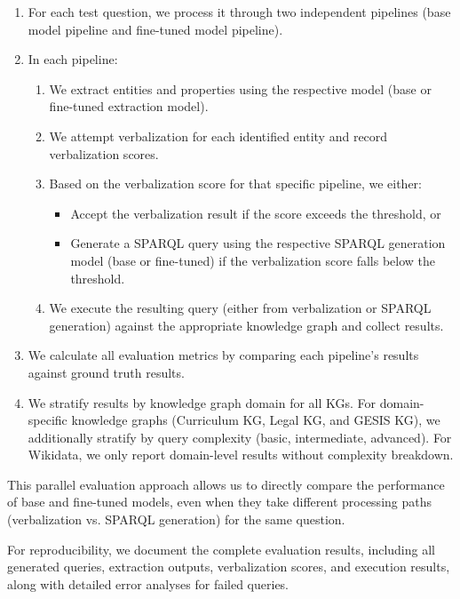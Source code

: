 \begin{enumerate}
    \item For each test question, we process it through two independent pipelines (base model pipeline and fine-tuned model pipeline).
    
    \item In each pipeline:
    \begin{enumerate}
        \item We extract entities and properties using the respective model (base or fine-tuned extraction model).
        \item We attempt verbalization for each identified entity and record verbalization scores.
        \item Based on the verbalization score for that specific pipeline, we either:
        \begin{itemize}
            \item Accept the verbalization result if the score exceeds the threshold, or
            \item Generate a SPARQL query using the respective SPARQL generation model (base or fine-tuned) if the verbalization score falls below the threshold.
        \end{itemize}
        \item We execute the resulting query (either from verbalization or SPARQL generation) against the appropriate knowledge graph and collect results.
    \end{enumerate}
    
    \item We calculate all evaluation metrics by comparing each pipeline's results against ground truth results.
    
    \item We stratify results by knowledge graph domain for all KGs. For domain-specific knowledge graphs (Curriculum KG, Legal KG, and GESIS KG), we additionally stratify by query complexity (basic, intermediate, advanced). For Wikidata, we only report domain-level results without complexity breakdown.
\end{enumerate}

This parallel evaluation approach allows us to directly compare the performance of base and fine-tuned models, even when they take different processing paths (verbalization vs. SPARQL generation) for the same question.

For reproducibility, we document the complete evaluation results, including all generated queries, extraction outputs, verbalization scores, and execution results, along with detailed error analyses for failed queries.


